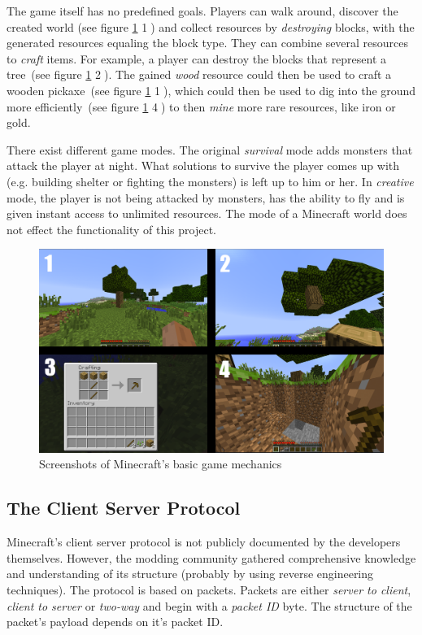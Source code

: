 The game itself has no predefined goals. Players can walk around, discover the created world (see figure \ref{mc_mechanics} \textcircled{1}) and collect resources by \emph{destroying} blocks, with the generated resources equaling the block type. They can combine several resources to \emph{craft} items. For example, a player can destroy the blocks that represent a tree~(see figure \ref{mc_mechanics} \textcircled{2}). The gained \emph{wood} resource could then be used to craft a wooden pickaxe~(see figure \ref{mc_mechanics} \textcircled{1}), which could then be used to dig into the ground more efficiently~(see figure \ref{mc_mechanics} \textcircled{4}) to then \emph{mine} more rare resources, like iron or gold.

There exist different game modes. The original \emph{survival} mode adds monsters that attack the player at night. What solutions to survive the player comes up with (e.g. building shelter or fighting the monsters) is left up to him or her.
In \emph{creative} mode, the player is not being attacked by monsters, has the ability to fly and is given instant access to unlimited resources. The mode of a Minecraft world does not effect the functionality of this project.

\begin{figure}[h]
  \centering
    \includegraphics[width=15cm]{graphics/minecraft_mechanics}
  \caption{Screenshots of Minecraft's basic game mechanics}
  \label{mc_mechanics}
\end{figure}

        \subsection{The Client Server Protocol}
        \label{client_server_protocol}
Minecraft's client server protocol is not publicly documented by the developers themselves. However, the modding community gathered comprehensive knowledge and understanding of its structure (probably by using reverse engineering techniques). The protocol is based on packets. 
Packets are either \emph{server to client}, \emph{client to server} or \emph{two-way} and begin with a \emph{packet ID} byte. The structure of the packet's payload depends on it's packet ID.
 
